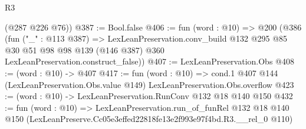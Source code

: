 \begin{lexlean}{R3}
\begin{coremodule}
      (@287 @226 @76))
@387 := Bool.false
@406 := fun (word : @10) =>
  @200
    (@386
      (fun ("_" : @113 @387) =>
      LexLeanPreservation.conv_build
        @132
        @295
        @85
        @30
        @51
        @98
        @98
        @139
        (@146 @387)
        @360
        LexLeanPreservation.construct_false))
@407 := LexLeanPreservation.Obs
@408 := (word : @10) -> @407
@417 := fun (word : @10) =>
  cond.{1} @407 @144 (LexLeanPreservation.Obs.value @149) LexLeanPreservation.Obs.overflow
@423 := (word : @10) -> LexLeanPreservation.RunConv @132 @18 @140 @150
@432 := fun (word : @10) =>
  LexLeanPreservation.run_of_funRel
    @132
    @18
    @140
    @150
    (LexLeanPreserve.Cc05e3effed22818fe13e2f993e97f4bd.R3.__rel_0 @110)
\end{coremodule}
\end{lexlean}
